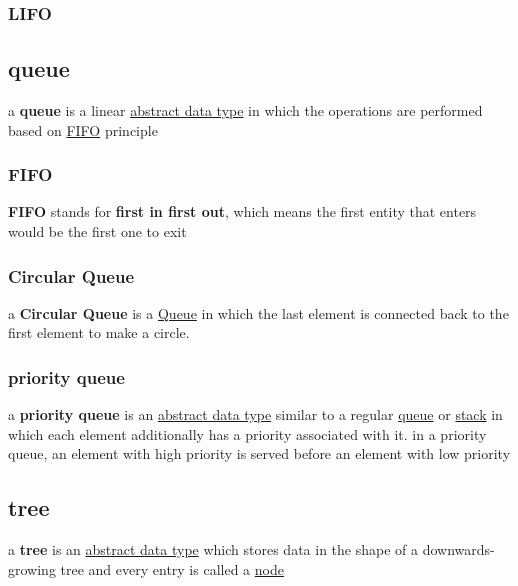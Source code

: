\documentclass[a4paper,12pt]{article}
\begin{document}
\subsubsection{LIFO}
\label{sec:org131c393}
\subsection{queue}
\label{sec:orga0bf8b2}
\begin{definition}
a \textbf{queue} is a linear \hyperref[sec:orga3b31cf]{abstract data type} in which the operations are performed based on \hyperref[sec:orga6fb74b]{FIFO} principle\\[0pt]
\end{definition}
\subsubsection{FIFO}
\label{sec:orga6fb74b}
\begin{definition}
\textbf{FIFO} stands for \textbf{first in first out}, which means the first entity that enters would be the first one to exit\\[0pt]
\end{definition}
\subsubsection{Circular Queue}
\label{sec:org4f2af1c}
\begin{definition}
a \textbf{Circular Queue} is a \hyperref[sec:orga0bf8b2]{Queue} in which the last element is connected back to the first element to make a circle.\\[0pt]
\end{definition}
\subsubsection{priority queue}
\label{sec:org6cf60c4}
a \textbf{priority queue} is an \href{data_structures.org}{abstract data type} similar to a regular \hyperref[sec:orga0bf8b2]{queue} or \hyperref[sec:org1fa0f82]{stack} in which each element additionally has a priority associated with it. in a priority queue, an element with high priority is served before an element with low priority\\[0pt]
\subsection{tree}
\label{sec:org6b67a14}
\begin{definition}
a \textbf{tree} is an \hyperref[sec:orga3b31cf]{abstract data type} which stores data in the shape of a downwards-growing tree and every entry is called a \hyperref[sec:orgec4976f]{node}\\[0pt]
\end{definition}
\end{document}
